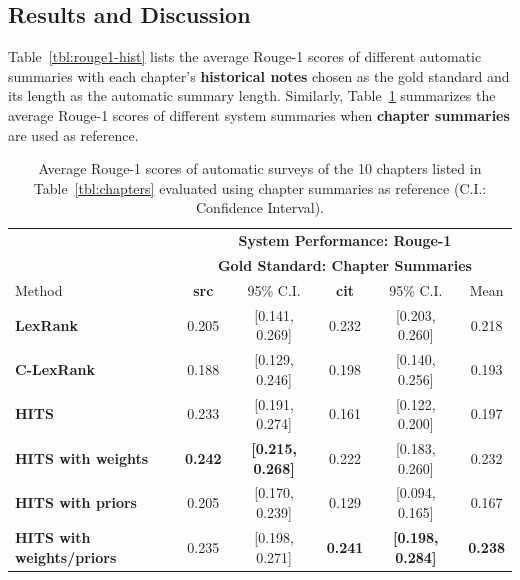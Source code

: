\subsection{Results and Discussion}
Table~\ref{tbl:rouge1-hist} lists the average Rouge-1 scores of different automatic summaries with each chapter's {\bf historical notes} chosen as the gold standard and its length as the automatic summary length. Similarly, Table~\ref{tbl:rouge1-summ} summarizes the average Rouge-1 scores of different system summaries when {\bf chapter summaries} are used as reference.

\begin{table}[ht!]
\centering
{\small
\begin{tabular}{l@{\hspace{2cm}}cc@{\hspace{1cm}}cc@{\hspace{1cm}}c} \hline
       & \multicolumn{5}{c}{{\bf System Performance: Rouge-1}}\\
       & \multicolumn{5}{c}{{\bf Gold Standard: Chapter Summaries}}\\ \hline
Method & {\bf  src} & 95\% C.I. & {\bf cit} & 95\% C.I. & Mean\\ \hline \hline
{\bf LexRank}                   & 0.205 & [0.141, 0.269]  &  0.232 & [0.203, 0.260]  & 0.218 \\
{\bf C-LexRank}                 & 0.188 & [0.129, 0.246]  &  0.198 & [0.140, 0.256]  & 0.193 \\
{\bf HITS}                      & 0.233 & [0.191, 0.274]  &  0.161 & [0.122, 0.200]  & 0.197 \\
{\bf HITS with weights}         & {\bf 0.242} & {\bf [0.215, 0.268]}  &  0.222 & [0.183, 0.260]  & 0.232 \\
{\bf HITS with priors}          & 0.205 & [0.170, 0.239]  &  0.129 & [0.094, 0.165]  & 0.167 \\
{\bf HITS with weights/priors}  & 0.235 & [0.198, 0.271]  &  {\bf 0.241} & {\bf [0.198, 0.284]}  & {\bf 0.238} \\ \hline
\end{tabular}}
\caption{Average Rouge-1 scores of automatic surveys of the 10 chapters listed in Table~\ref{tbl:chapters} evaluated using chapter summaries as reference (C.I.: Confidence Interval).}\label{tbl:rouge1-summ}
\end{table}

